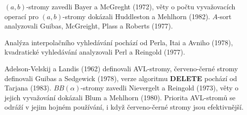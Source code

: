 \documentclass[a4paper,12pt]{article}
\begin{document}
$(a,b)$-stromy zavedli Bayer a McGreght (1972),\newline 
věty o počtu vyvažovacích operací pro $(a,b)$-stromy dokázali 
Huddleston a Mehlhorn (1982).\newline 
$A$-sort analyzovali Guibas, McGreight, Plass a Roberts (1977).

Analýza interpolačního vyhledávání pochází od Perla, 
Itai a Avniho (1978),\newline 
kvadratické vyhledávání analyzovali Perl a Reingold (1977).

Adelson-Velskij a Landis (1962) definovali 
AVL-stromy,\newline 
červeno-černé stromy definovali Guibas a Sedgewick 
(1978),\newline 
verze algoritmu {\bf DELETE} pochází od Tarjana (1983).
$BB(\alpha )$-stromy zavedli Nievergelt a Reingold (1973),\newline 
věty o jejich vyvažování dokázali Blum a Mehlhorn (1980).\newline 
Priorita AVL-stromů se odráží v 
jejim hojném používání, i když červeno-černé stromy 
jsou efektivnější. 
\end{document}
